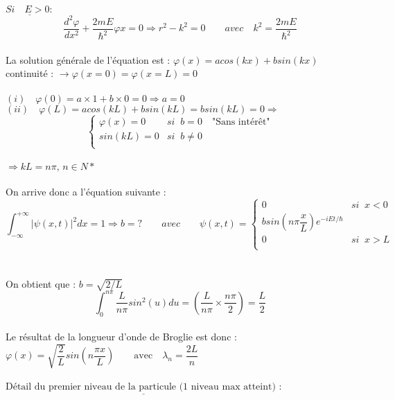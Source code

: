 \documentclass[11pt]{report}
\begin{document}
$\underline{Si \quad E>0:}$
\begin{equation}
    \dfrac{d^2\varphi}{dx^2}+\dfrac{2mE}{\hbar^2}\varphi{x} = 0 \Rightarrow r^2 - k^2 = 0 \qquad avec \quad k^2=\dfrac{2mE}{\hbar^2}
    \nonumber
\end{equation}
\\
La solution générale de l'équation est : $\varphi(x) = acos(kx) + bsin(kx)$ \\
continuité : $\rightarrow \varphi(x=0) = \varphi(x=L)=0$\\
\\
$(i) \quad \varphi(0) = a \times 1 + b \times 0 = 0 \Rightarrow a = 0$\\
$(ii) \quad \varphi(L) = a cos(kL) +bsin(kL) = bsin(kL) = 0 \Rightarrow$ \begin{equation}
\begin{cases} 
\varphi(x) = 0 & si \;\; b=0 \quad \textrm{"Sans intérêt"} \\
sin(kL)=0 & si \;\; b\ne0\\
\end{cases}
\nonumber
\end{equation}\\
$\Rightarrow kL = n\pi,\, n \in N*$\\
\\
On arrive donc a l'équation suivante :\\
\begin{equation}
    \int_{-\infty}^{+\infty} \lvert \psi(x,t)\rvert^2dx=1 \Rightarrow b = ? \qquad avec \qquad \psi(x,t) = \begin{cases} 
0 & si \;\; x<0  \\
b sin(n\pi\dfrac{x}{L}) e^{-iEt/\hbar} \\
0 & si \;\;x>L \\
\end{cases}
\end{equation}\\
\\
On obtient que  : $b = \sqrt{2/L}$ \quad
\begin{equation}
    \int_{0}^{n\pi}\dfrac{L}{n\pi}sin^2(u)du = (\dfrac{L}{n\pi} \times \dfrac{n\pi}{2} )=\dfrac{L}{2}
    \nonumber
\end{equation}\\
Le résultat de la longueur d'onde de Broglie est donc : $\varphi(x)=\sqrt{\dfrac{2}{L}}sin(n\dfrac{\pi x}{L}) \qquad \textrm{avec}\quad \lambda_n =\dfrac{2L}{n}$\\
\\
$\underline{\textrm{Détail du premier niveau de la particule (1 niveau max atteint) :}}$
\end{document}
